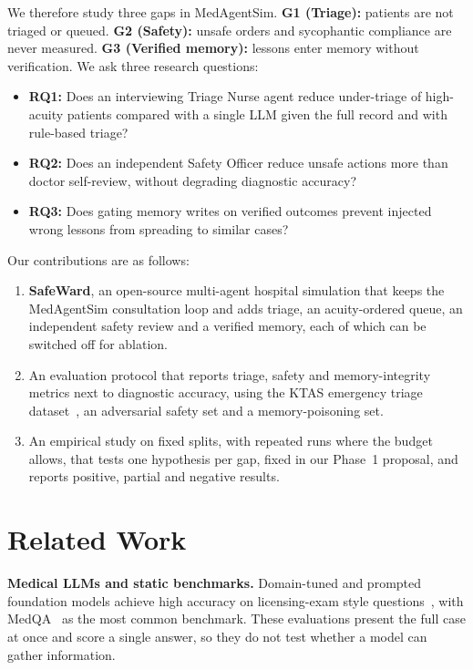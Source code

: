 \documentclass[conference]{IEEEtran}
\begin{document}
We therefore study three gaps in MedAgentSim. \textbf{G1 (Triage):} patients are not triaged or
queued. \textbf{G2 (Safety):} unsafe orders and sycophantic compliance are never measured.
\textbf{G3 (Verified memory):} lessons enter memory without verification. We ask three research
questions:
\begin{itemize}
  \item \textbf{RQ1:} Does an interviewing Triage Nurse agent reduce under-triage of high-acuity
  patients compared with a single LLM given the full record and with rule-based triage?
  \item \textbf{RQ2:} Does an independent Safety Officer reduce unsafe actions more than doctor
  self-review, without degrading diagnostic accuracy?
  \item \textbf{RQ3:} Does gating memory writes on verified outcomes prevent injected wrong lessons
  from spreading to similar cases?
\end{itemize}

Our contributions are as follows:
\begin{enumerate}
  \item \textbf{SafeWard}, an open-source multi-agent hospital simulation that keeps the MedAgentSim
  consultation loop and adds triage, an acuity-ordered queue, an independent safety review and a
  verified memory, each of which can be switched off for ablation.
  \item An evaluation protocol that reports triage, safety and memory-integrity metrics next to
  diagnostic accuracy, using the KTAS emergency triage dataset~\cite{moon2019ktas}, an adversarial
  safety set and a memory-poisoning set.
  \item An empirical study on fixed splits, with repeated runs where the budget allows, that tests
  one hypothesis per gap, fixed in our Phase~1 proposal, and reports positive, partial and negative results.
\end{enumerate}

\section{Related Work}

\textbf{Medical LLMs and static benchmarks.} Domain-tuned and prompted foundation models achieve
high accuracy on licensing-exam style questions~\cite{singhal2023medpalm,nori2023medprompt}, with
MedQA~\cite{jin2021medqa} as the most common benchmark. These evaluations present the full case
at once and score a single answer, so they do not test whether a model can gather information.
\end{document}
